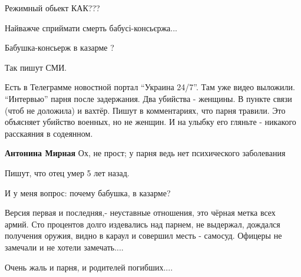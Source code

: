 \begin{itemize}
Режимный обьект КАК???

Найважче сприймати смерть бабусі-консьєржа...

Бабушка-консьерж в казарме ?

Так пишут СМИ.


Есть в Телеграмме новостной портал \enquote{Украина 24/7}. Там уже видео выложили. \enquote{Интервью} парня после задержания.
Два убийства - женщины. В пункте связи (чтоб не доложила) и вахтёр.
Пишут в комментариях, что парня травили. Это объясняет убийство военных, но не женщин.
И на улыбку его гляньте - никакого расскаяния в содеянном.

\textbf{Антонина Мирная} Ох, не прост; у парня ведь нет психического заболевания

Пишут, что отец умер 5 лет назад.

И у меня вопрос: почему бабушка, в казарме?


Версия первая и последняя,- неуставные отношения, это чёрная метка всех армий.
Сто процентов долго издевались над парнем, не выдержал, дождался получения
оружия, видно в караул и совершил месть - самосуд. Офицеры не замечали и не
хотели замечать....

Очень жаль и парня, и родителей погибших....

\end{itemize} %
